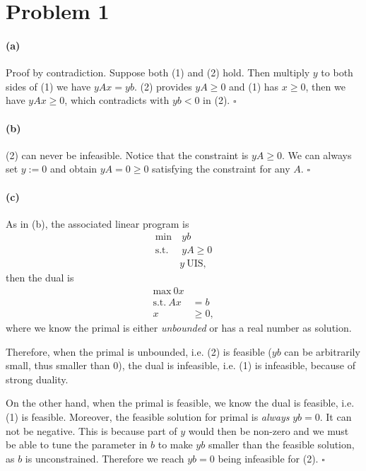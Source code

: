 \documentclass[12pt]{article}
\begin{document}
	
\section*{Problem 1}
\paragraph{(a)} Proof by contradiction. Suppose both (1) and (2) hold. Then multiply $y$ to both sides of (1) we have $yAx = yb$. (2) provides $yA \geq 0$ and (1) has $x\geq 0$, then we have $yAx \geq 0$, which contradicts with $yb < 0$ in (2). $\square$

\paragraph{(b)} (2) can never be infeasible. Notice that the constraint is $yA \geq 0$. We can always set $y :=0$ and obtain $yA = 0 \geq 0$ satisfying the constraint for any $A$. $\square$

\paragraph{(c)} As in (b), the associated linear program is 
\begin{align*}
\text{min} &~ yb\\
\text{s.t.} &~ yA \geq 0\\
& y ~\text{UIS},
\end{align*}
then the dual is 
\begin{align*}
\text{max} ~ 0x& \\
\text{s.t.} ~ Ax &= b\\
x &\geq 0,
\end{align*}
where we know the primal is either \emph{unbounded} or {has a real number as solution}. 

Therefore, when the primal is unbounded, i.e. (2) is feasible ($yb$ can be arbitrarily small, thus smaller than 0), the dual is infeasible, i.e. (1) is infeasible, because of strong duality.

On the other hand, when the primal is feasible, we know the dual is feasible, i.e. (1) is feasible. Moreover, the feasible solution for primal is \emph{always} $yb=0$. It can not be negative. This is because part of $y$ would then be non-zero and we must be able to tune the parameter in $b$ to make $yb$ smaller than the feasible solution, as $b$ is unconstrained. Therefore we reach $yb=0$ being infeasible for (2). $\square$

\newpage
\end{document}
